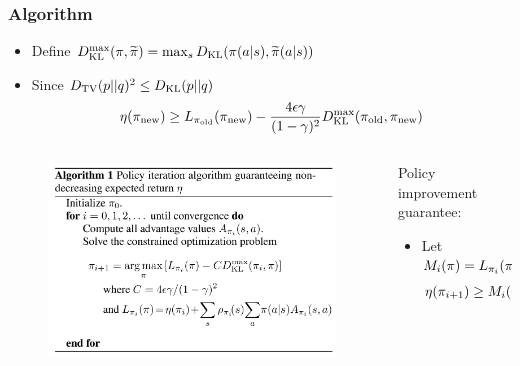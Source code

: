 \documentclass[9pt]{beamer}
\theoremstyle{remark}
\begin{document}
\begin{frame}
    \frametitle{Algorithm}
    \begin{itemize}
    \item Define $D_{\rm KL}^{\max} (\pi, \widetilde{\pi}) = \max_s D_{\rm KL} (\pi(a|s), \widetilde{\pi}(a|s))$
    \item Since $D_{\rm TV}(p || q)^2 \leq D_{\rm KL}(p || q)$
            \begin{equation}
                \label{eq:policy_improvement}
                \eta(\pi_{\rm new}) \geq L_{\pi_{\rm old}}(\pi_{\rm new}) - \dfrac{4\epsilon \gamma}{(1-\gamma)^2} D_{\rm KL}^{\max}(\pi_{\rm old}, \pi_{\rm new})
            \end{equation} 
    \end{itemize}

    \begin{columns}
        \begin{column}{0.4\textwidth}
        \begin{figure}
            \centering
            \includegraphics[width=\textwidth]{figures/alg1.png}
        \end{figure}
        \end{column}
        \begin{column}{0.55\textwidth}
            Policy improvement guarantee: 
            \begin{itemize}
                \item Let $M_i(\pi) = L_{\pi_i}(\pi) - C D_{\rm KL}^{\max}(\pi_i, \pi) $
                    \begin{align*}
                        \eta(\pi_{i+1}) 
                        &\geq M_i(\pi_{i+1}) \quad \text{(by \ref{eq:policy_improvement})} \\

\end{align*}
\end{itemize}
\end{column}
\end{columns}
\end{frame}
\end{document}
